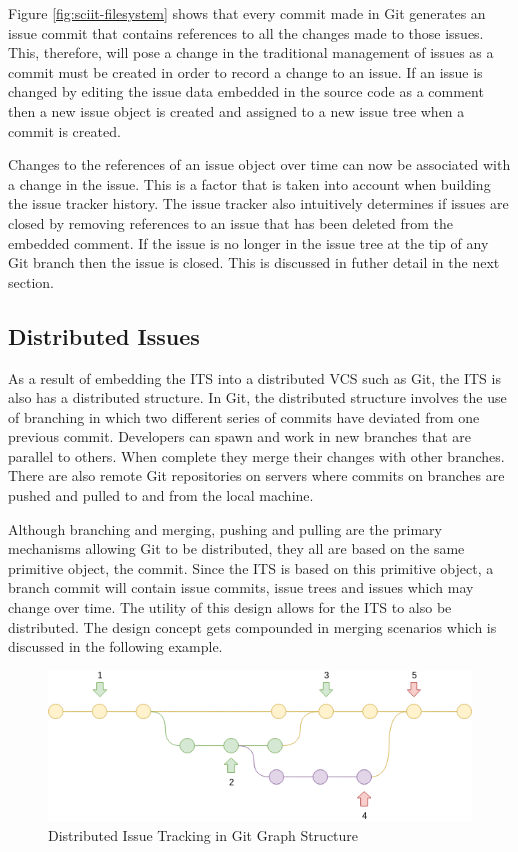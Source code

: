 \documentclass{mproj}
\begin{document}
Figure \ref{fig:sciit-filesystem} shows that every commit made in Git generates an issue commit that contains references to all the changes made to those issues. This, therefore, will pose a change in the traditional management of issues as a commit must be created in order to record a change to an issue. If an issue is changed by editing the issue data embedded in the source code as a comment then a new issue object is created and assigned to a new issue tree when a commit is created. 

Changes to the references of an issue object over time can now be associated with a change in the issue. This is a factor that is taken into account when building the issue tracker history. The issue tracker also intuitively determines if issues are closed by removing references to an issue that has been deleted from the embedded comment. If the issue is no longer in the issue tree at the tip of any Git branch then the issue is closed. This is discussed in futher detail in the next section.

\subsection{Distributed Issues}

As a result of embedding the ITS into a distributed VCS such as Git, the ITS is also has a distributed structure. In Git, the distributed structure involves the use of branching in which two different series of commits have deviated from one previous commit. Developers can spawn and work in new branches that are parallel to others. When complete they merge their changes with other branches. There are also remote Git repositories on servers where commits on branches are pushed and pulled to and from the local machine.

Although branching and merging, pushing and pulling are the primary mechanisms allowing Git to be distributed, they all are based on the same primitive object, the commit. Since the ITS is based on this primitive object, a branch commit will contain issue commits, issue trees and issues which may change over time. The utility of this design allows for the ITS to also be distributed. The design concept gets compounded in merging scenarios which is discussed in the following example.


\begin{figure}[h!]
\caption{Distributed Issue Tracking in Git Graph Structure}
\label{fig:distributed-issue-tracking}
\centering
\includegraphics[width=15cm]{distributed-issue-tracking}
\end{figure}
\end{document}
